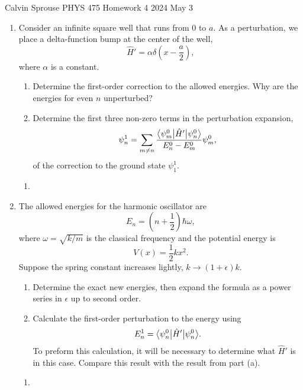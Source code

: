\documentclass[a4paper, 12pt]{config/homework}
\begin{document}
\noindent
\hfill Calvin Sprouse \hfill PHYS 475 Homework 4 \hfill 2024 May 3 \hfill
\bigskip

\begin{enumerate}
\item Consider an infinite square well that runs from 0 to \(a\). As a perturbation, we place a delta-function bump at the center of the well,
\[\hat{H}' = \alpha\delta\left(x-\frac{a}{2}\right),\]
where \(\alpha\) is a constant.
\begin{enumerate}[label=(\alph*)]
\item Determine the first-order correction to the allowed energies. Why are the energies for even \(n\) unperturbed?
\item Determine the first three non-zero terms in the perturbation expansion,
\[\psi^1_n = \sum_{m\ne n}\frac{\bra*{\psi_m^0}\hat{H}'\ket*{\psi_n^0}}{E_n^0-E_m^0}\psi_m^0,\]
of the correction to the ground state \(\psi_1^1\).
\end{enumerate}
\begin{enumerate}[label=(\alph*)]
\item 
\end{enumerate}

\pagebreak
\item The allowed energies for the harmonic oscillator are
\[E_n = \left(n + \frac{1}{2}\right)\hbar\omega,\]
where \(\omega = \sqrt{k/m}\) is the classical frequency and the potential energy is
\[V(x) = \frac{1}{2}kx^2.\]
Suppose the spring constant increases lightly, \(k\to\left(1+\epsilon\right)k\).
\begin{enumerate}[label=(\alph*)]
\item Determine the exact new energies, then expand the formula as a power series in \(\epsilon\) up to second order.
\item Calculate the first-order perturbation to the energy using
\[E_n^1=\bra*{\psi_n^0}\hat{H}'\ket*{\psi_n^0}.\]
To preform this calculation, it will be necessary to determine what \(\hat{H}'\) is in this case. Compare this result with the result from part (a).
\end{enumerate}
\begin{enumerate}[label=(\alph*)]
\item 
\end{enumerate}
\end{enumerate}
\end{document}
